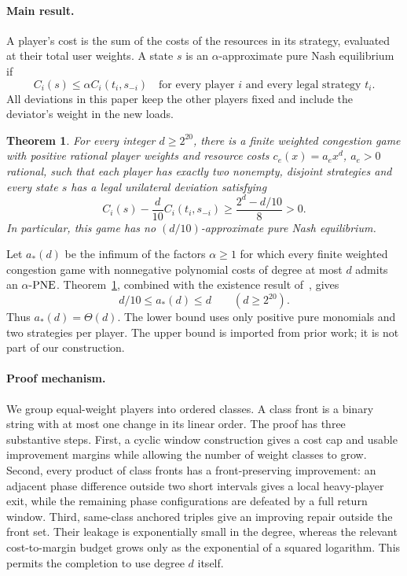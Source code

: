 \documentclass[11pt]{article}
\newtheorem{theorem}{Theorem}[section]
\theoremstyle{definition}
\theoremstyle{remark}
\newcommand{\PNE}{\textup{PNE}}
\begin{document}
\paragraph{Main result.}
A player's cost is the sum of the costs of the resources in its strategy, evaluated at their total user weights. A state $s$ is an $\alpha$-approximate pure Nash equilibrium if
\begin{equation}\label{eq:pne}
 C_i(s)\le\alpha C_i(t_i,s_{-i})
 \quad\text{for every player $i$ and every legal strategy $t_i$.}
\end{equation}
All deviations in this paper keep the other players fixed and include the deviator's weight in the new loads.

\begin{theorem}\label{thm:main}
For every integer $d\ge2^{20}$, there is a finite weighted congestion game with positive rational player weights and resource costs $c_e(x)=a_ex^d$, $a_e>0$ rational, such that each player has exactly two nonempty, disjoint strategies and every state $s$ has a legal unilateral deviation satisfying
\[
 C_i(s)-\frac d{10}C_i(t_i,s_{-i})
 \ge\frac{2^d-d/10}{8}>0.
\]
In particular, this game has no $(d/10)$-approximate pure Nash equilibrium.
\end{theorem}

Let $a_*(d)$ be the infimum of the factors $\alpha\ge1$ for which every finite weighted congestion game with nonnegative polynomial costs of degree at most $d$ admits an $\alpha$-$\PNE$. Theorem~\ref{thm:main}, combined with the existence result of~\cite{CF2021}, gives
\begin{equation}\label{eq:threshold}
 d/10\le a_*(d)\le d\qquad(d\ge2^{20}).
\end{equation}
Thus $a_*(d)=\Theta(d)$. The lower bound uses only positive pure monomials and two strategies per player. The upper bound is imported from prior work; it is not part of our construction.

\paragraph{Proof mechanism.}
We group equal-weight players into ordered classes. A class front is a binary string with at most one change in its linear order. The proof has three substantive steps. First, a cyclic window construction gives a cost cap and usable improvement margins while allowing the number of weight classes to grow. Second, every product of class fronts has a front-preserving improvement: an adjacent phase difference outside two short intervals gives a local heavy-player exit, while the remaining phase configurations are defeated by a full return window. Third, same-class anchored triples give an improving repair outside the front set. Their leakage is exponentially small in the degree, whereas the relevant cost-to-margin budget grows only as the exponential of a squared logarithm. This permits the completion to use degree $d$ itself.
\end{document}
